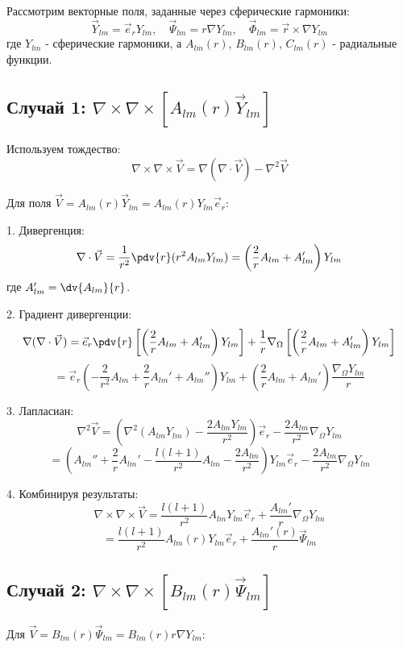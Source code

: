 \documentclass{article}
\begin{document}
Рассмотрим векторные поля, заданные через сферические гармоники:
\[
\vec{Y}_{lm} = \vec{e}_r Y_{lm}, \quad
\vec{\Psi}_{lm} = r \nabla Y_{lm}, \quad
\vec{\Phi}_{lm} = \vec{r} \times \nabla Y_{lm}
\]
где \( Y_{lm} \) - сферические гармоники, а \( A_{lm}(r) \), \( B_{lm}(r) \), \( C_{lm}(r) \) - радиальные функции.

\subsection{Случай 1: \( \nabla \times \nabla \times [A_{lm}(r) \vec{Y}_{lm}] \)}

Используем тождество:
\[
\nabla \times \nabla \times \vec{V} = \nabla (\nabla \cdot \vec{V}) - \nabla^2 \vec{V}
\]

Для поля \( \vec{V} = A_{lm}(r) \vec{Y}_{lm} = A_{lm}(r) Y_{lm} \vec{e}_r \):

1. Дивергенция:
\[
\nabla \cdot \vec{V} = \frac{1}{r^2} \pdv{r} (r^2 A_{lm} Y_{lm}) = \left( \frac{2}{r} A_{lm} + A_{lm}' \right) Y_{lm}
\]
где \( A_{lm}' = \dv{A_{lm}}{r} \).

2. Градиент дивергенции:
\[
\nabla (\nabla \cdot \vec{V}) = \vec{e}_r \pdv{r} \left[ \left( \frac{2}{r} A_{lm} + A_{lm}' \right) Y_{lm} \right] + \frac{1}{r} \nabla_\Omega \left[ \left( \frac{2}{r} A_{lm} + A_{lm}' \right) Y_{lm} \right]
\]
\[
= \vec{e}_r \left( -\frac{2}{r^2} A_{lm} + \frac{2}{r} A_{lm}' + A_{lm}'' \right) Y_{lm} + \left( \frac{2}{r} A_{lm} + A_{lm}' \right) \frac{\nabla_\Omega Y_{lm}}{r}
\]

3. Лапласиан:
\[
\nabla^2 \vec{V} = \left( \nabla^2 (A_{lm} Y_{lm}) - \frac{2 A_{lm} Y_{lm}}{r^2} \right) \vec{e}_r - \frac{2 A_{lm}}{r^2} \nabla_\Omega Y_{lm}
\]
\[
= \left( A_{lm}'' + \frac{2}{r} A_{lm}' - \frac{l(l+1)}{r^2} A_{lm} - \frac{2 A_{lm}}{r^2} \right) Y_{lm} \vec{e}_r - \frac{2 A_{lm}}{r^2} \nabla_\Omega Y_{lm}
\]

4. Комбинируя результаты:
\[
\nabla \times \nabla \times \vec{V} = \frac{l(l+1)}{r^2} A_{lm} Y_{lm} \vec{e}_r + \frac{A_{lm}'}{r} \nabla_\Omega Y_{lm}
\]
\[
= \boxed{ \frac{l(l+1)}{r^2} A_{lm}(r) Y_{lm} \vec{e}_r + \frac{A_{lm}'(r)}{r} \vec{\Psi}_{lm} }
\]

\subsection{Случай 2: \( \nabla \times \nabla \times [B_{lm}(r) \vec{\Psi}_{lm}] \)}

Для \( \vec{V} = B_{lm}(r) \vec{\Psi}_{lm} = B_{lm}(r) r \nabla Y_{lm} \):
\end{document}
